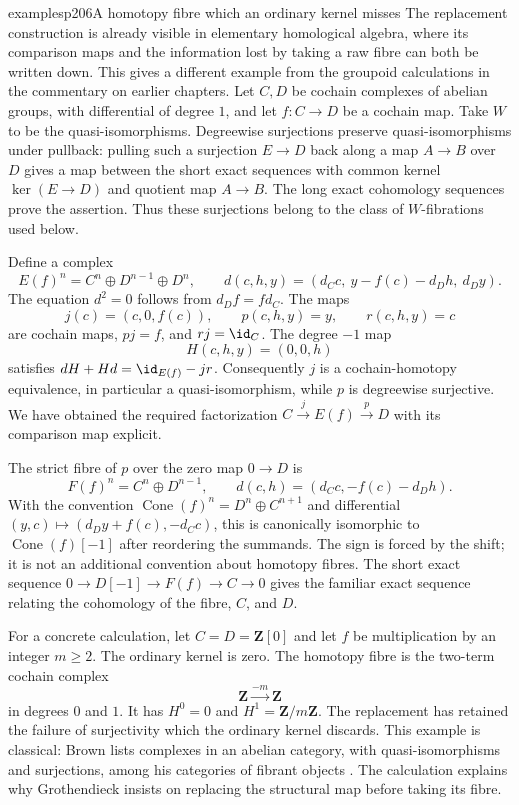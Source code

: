 \begin{dcomment}{examples}{p206}{A homotopy fibre which an ordinary kernel misses}
The replacement construction is already visible in elementary homological algebra, where its comparison maps and the information lost by taking a raw fibre can both be written down. This gives a different example from the groupoid calculations in the commentary on earlier chapters. Let $C,D$ be cochain complexes of abelian groups, with differential of degree $1$, and let $f:C\to D$ be a cochain map. Take $W$ to be the quasi-isomorphisms. Degreewise surjections preserve quasi-isomorphisms under pullback: pulling such a surjection $E\to D$ back along a map $A\to B$ over $D$ gives a map between the short exact sequences with common kernel $\ker(E\to D)$ and quotient map $A\to B$. The long exact cohomology sequences prove the assertion. Thus these surjections belong to the class of $W$-fibrations used below.

Define a complex
\[
 E(f)^n=C^n\oplus D^{n-1}\oplus D^n,
 \qquad
 d(c,h,y)=(d_Cc,\ y-f(c)-d_Dh,\ d_Dy).
\]
The equation $d^2=0$ follows from $d_Df=fd_C$. The maps
\[
 j(c)=(c,0,f(c)),\qquad p(c,h,y)=y,\qquad r(c,h,y)=c
\]
are cochain maps, $pj=f$, and $rj=\id_C$. The degree $-1$ map
\[
 H(c,h,y)=(0,0,h)
\]
satisfies $dH+Hd=\id_{E(f)}-jr$. Consequently $j$ is a cochain-homotopy equivalence, in particular a quasi-isomorphism, while $p$ is degreewise surjective. We have obtained the required factorization $C\xrightarrow{j}E(f)\xrightarrow{p}D$ with its comparison map explicit.

The strict fibre of $p$ over the zero map $0\to D$ is
\[
 F(f)^n=C^n\oplus D^{n-1},\qquad
 d(c,h)=(d_Cc,-f(c)-d_Dh).
\]
With the convention $\operatorname{Cone}(f)^n=D^n\oplus C^{n+1}$ and differential $(y,c)\mapsto(d_Dy+f(c),-d_Cc)$, this is canonically isomorphic to $\operatorname{Cone}(f)[-1]$ after reordering the summands. The sign is forced by the shift; it is not an additional convention about homotopy fibres. The short exact sequence $0\to D[-1]\to F(f)\to C\to0$ gives the familiar exact sequence relating the cohomology of the fibre, $C$, and $D$.

For a concrete calculation, let $C=D=\mathbf Z[0]$ and let $f$ be multiplication by an integer $m\geq2$. The ordinary kernel is zero. The homotopy fibre is the two-term cochain complex
\[
 \mathbf Z\xrightarrow{-m}\mathbf Z
\]
in degrees $0$ and $1$. It has $H^0=0$ and $H^1=\mathbf Z/m\mathbf Z$. The replacement has retained the failure of surjectivity which the ordinary kernel discards. This example is classical: Brown lists complexes in an abelian category, with quasi-isomorphisms and surjections, among his categories of fibrant objects \citep[Part I, \S1, Example~3, p.~421]{Brown1973}. The calculation explains why Grothendieck insists on replacing the structural map before taking its fibre.
\end{dcomment}

